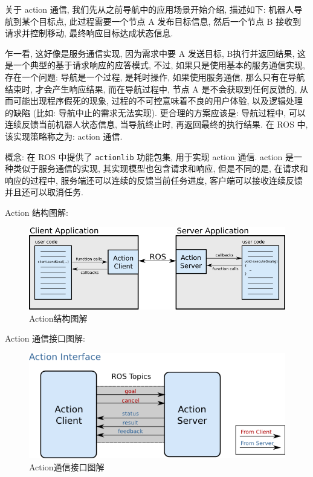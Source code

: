 \documentclass[openany, fontset=windowsold]{ctexbook}
\theoremstyle{kaiti}
\theoremstyle{normal}
\begin{document}
关于 action 通信, 我们先从之前导航中的应用场景开始介绍, 描述如下: 机器人导航到某个目标点, 此过程需要一个节点 A 发布目标信息, 然后一个节点 B 接收到请求并控制移动, 最终响应目标达成状态信息.

乍一看, 这好像是服务通信实现, 因为需求中要 A 发送目标, B执行并返回结果, 这是一个典型的基于请求响应的应答模式, 不过, 如果只是使用基本的服务通信实现, 存在一个问题: 导航是一个过程, 是耗时操作, 如果使用服务通信, 那么只有在导航结束时, 才会产生响应结果, 而在导航过程中, 节点 A 是不会获取到任何反馈的, 从而可能出现程序假死的现象, 过程的不可控意味着不良的用户体验, 以及逻辑处理的缺陷 (比如: 导航中止的需求无法实现). 更合理的方案应该是: 导航过程中, 可以连续反馈当前机器人状态信息, 当导航终止时, 再返回最终的执行结果. 在 ROS 中, 该实现策略称之为: action 通信.

概念: 在 ROS 中提供了 \verb|actionlib| 功能包集, 用于实现  action 通信. action 是一种类似于服务通信的实现, 其实现模型也包含请求和响应, 但是不同的是, 在请求和响应的过程中, 服务端还可以连续的反馈当前任务进度, 客户端可以接收连续反馈并且还可以取消任务.

Action 结构图解:

\begin{figure}[!ht]
  \centering
  \includegraphics[width=.9\textwidth]{ros_action.png}
  \caption{Action结构图解}
  \label{fig:ros_action}
\end{figure}

Action 通信接口图解:

\begin{figure}[!ht]
  \centering
  \includegraphics[width=.7\textwidth]{ros_action_interface.png}
  \caption{Action通信接口图解}
  \label{fig:ros_action_interface}
\end{figure}
\end{document}
